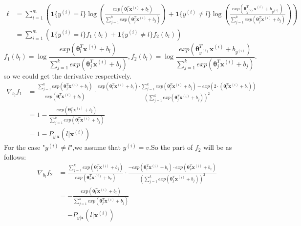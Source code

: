 \documentclass[a4paper]{article}
\begin{document}
\begin{equation*}
\begin{aligned}
\ell &= \sum_{i=1}^m\left( \mathbf{1}\{y^{(i)} = l\}\log\left( \frac{exp(\mathbf{\theta}_l^T\mathbf{x}^{(i)}+b_l)}{\sum_{j=1}^k exp(\mathbf{\theta}_j^T\mathbf{x}^{(i)}+b_j)} \right) + 
\mathbf{1}\{y^{(i)} \neq l\}\log\left( \frac{exp(\mathbf{\theta}_{y^{(i)}}^T\mathbf{x}^{(i)}+b_{y^{(i)}})}{\sum_{j=1}^k exp(\mathbf{\theta}_j^T\mathbf{x}^{(i)}+b_j)} \right)
\right)\\
&= \sum_{i=1}^m (\mathbf{1}\{y^{(i)} = l\} f_1(b_l)+\mathbf{1}\{y^{(i)} \neq l\}f_2(b_l))
\end{aligned}
\end{equation*}
$$
f_1(b_l) = \log\frac{exp(\mathbf{\theta}_l^T\mathbf{x}^{(i)}+b_l)}{\sum_{j=1}^k exp(\mathbf{\theta}_j^T\mathbf{x}^{(i)}+b_j)},
f_2(b_l) = \log\frac{exp(\mathbf{\theta}_{y^{(i)}}^T\mathbf{x}^{(i)}+b_{y^{(i)}})}{\sum_{j=1}^k exp(\mathbf{\theta}_j^T\mathbf{x}^{(i)}+b_j)}
.$$
so we could get the derivative respectively.
\begin{equation*}
\begin{aligned}
\nabla _{b_l} f_1 &=  \frac{\sum_{j=1}^k exp(\mathbf{\theta}_j^T\mathbf{x}^{(i)}+b_j)}{exp(\mathbf{\theta}_l^T\mathbf{x}^{(i)}+b_l)}\cdot
\frac{exp(\mathbf{\theta}_l^T\mathbf{x}^{(i)}+b_l)\cdot \sum_{j=1}^k exp(\mathbf{\theta}_j^T\mathbf{x}^{(i)}+b_j) - exp(2\cdot(\mathbf{\theta}_l^T\mathbf{x}^{(i)}+b_l))}{(\sum_{j=1}^k exp(\mathbf{\theta}_j^T\mathbf{x}^{(i)}+b_j))^2}\\
&=1 - \frac{exp(\mathbf{\theta}_l^T\mathbf{x}^{(i)}+b_l)}{\sum_{j=1}^k exp(\mathbf{\theta}_j^T\mathbf{x}^{(i)}+b_j)}\\
&= 1 - {P_{y|\mathbf{x}}(l|\mathbf{x}^{(i)})}
\end{aligned}
\end{equation*}
For the case "$y^{(i)} \neq l$",we assume that $y^{(i)} = v$.So the part of $f_2$ will be as follows:
\begin{equation*}
\begin{aligned}
\nabla _{b_l} f_2 &=  \frac{\sum_{j=1}^k exp(\mathbf{\theta}_j^T\mathbf{x}^{(i)}+b_j)}{exp(\mathbf{\theta}_v^T\mathbf{x}^{(i)}+b_v)}\cdot
\frac{- exp(\mathbf{\theta}_l^T\mathbf{x}^{(i)}+b_l)\cdot exp(\mathbf{\theta}_v^T\mathbf{x}^{(i)}+b_v)}{(\sum_{j=1}^k exp(\mathbf{\theta}_j^T\mathbf{x}^{(i)}+b_j))^2}\\
&= - \frac{exp(\mathbf{\theta}_l^T\mathbf{x}^{(i)}+b_l)}{\sum_{j=1}^k exp(\mathbf{\theta}_j^T\mathbf{x}^{(i)}+b_j)}\\
&=  - {P_{y|\mathbf{x}}(l|\mathbf{x}^{(i)})}
\end{aligned}
\end{equation*}
\end{document}
